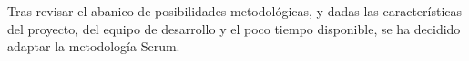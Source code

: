 %

Tras revisar el abanico de posibilidades metodológicas, y dadas las características del proyecto, del equipo de desarrollo y el poco tiempo disponible, se ha decidido adaptar la metodología Scrum.

